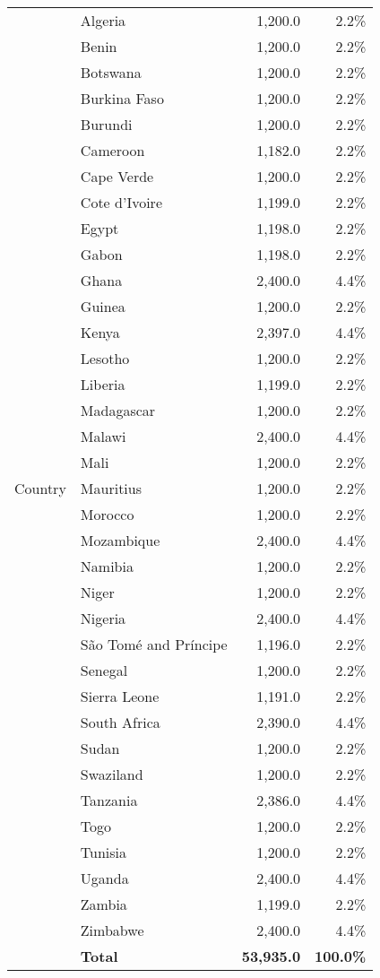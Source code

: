\documentclass{article}
\begin{document}
\begin{table}[H]
\begin{tabular}{llrr}
\multirow{37}{*}{Country} 
    & Algeria & 1,200.0 & 2.2\% \\
    & Benin & 1,200.0 & 2.2\% \\
    & Botswana & 1,200.0 & 2.2\% \\
    & Burkina Faso & 1,200.0 & 2.2\% \\
    & Burundi & 1,200.0 & 2.2\% \\
    & Cameroon & 1,182.0 & 2.2\% \\
    & Cape Verde & 1,200.0 & 2.2\% \\
    & Cote d'Ivoire & 1,199.0 & 2.2\% \\
    & Egypt & 1,198.0 & 2.2\% \\
    & Gabon & 1,198.0 & 2.2\% \\
    & Ghana & 2,400.0 & 4.4\% \\
    & Guinea & 1,200.0 & 2.2\% \\
    & Kenya & 2,397.0 & 4.4\% \\
    & Lesotho & 1,200.0 & 2.2\% \\
    & Liberia & 1,199.0 & 2.2\% \\
    & Madagascar & 1,200.0 & 2.2\% \\
    & Malawi & 2,400.0 & 4.4\% \\
    & Mali & 1,200.0 & 2.2\% \\
    & Mauritius & 1,200.0 & 2.2\% \\
    & Morocco & 1,200.0 & 2.2\% \\
    & Mozambique & 2,400.0 & 4.4\% \\
    & Namibia & 1,200.0 & 2.2\% \\
    & Niger & 1,200.0 & 2.2\% \\
    & Nigeria & 2,400.0 & 4.4\% \\
    & São Tomé and Príncipe & 1,196.0 & 2.2\% \\
    & Senegal & 1,200.0 & 2.2\% \\
    & Sierra Leone & 1,191.0 & 2.2\% \\
    & South Africa & 2,390.0 & 4.4\% \\
    & Sudan & 1,200.0 & 2.2\% \\
    & Swaziland & 1,200.0 & 2.2\% \\
    & Tanzania & 2,386.0 & 4.4\% \\
    & Togo & 1,200.0 & 2.2\% \\
    & Tunisia & 1,200.0 & 2.2\% \\
    & Uganda & 2,400.0 & 4.4\% \\
    & Zambia & 1,199.0 & 2.2\% \\
    & Zimbabwe & 2,400.0 & 4.4\% \\
    & \textbf{Total} & \textbf{53,935.0} & \textbf{100.0\%} \\
\bottomrule

\end{tabular}
\end{table}
\end{document}

